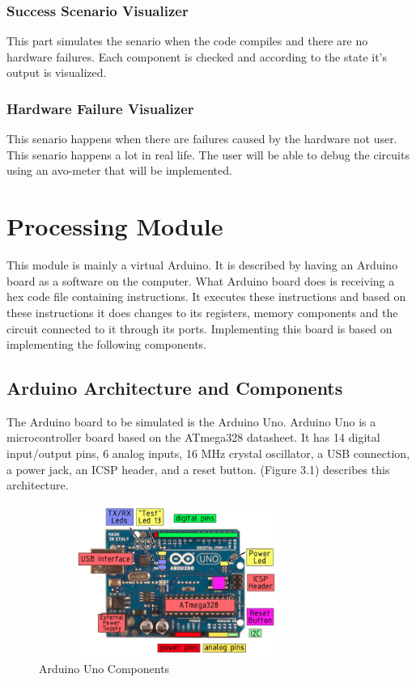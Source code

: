 \documentclass[12pt, a4paper]{report}
\begin{document}
\subsection{Success Scenario Visualizer}
This part simulates the senario when the code compiles and there are no hardware failures. Each component is checked and according to the state it’s output is visualized.
\subsection{Hardware Failure Visualizer}
This senario happens when there are failures caused by the hardware not user. This senario happens a lot in real life. The user will be able to debug the circuits using an avo-meter that will be implemented.
\newpage

\chapter{Processing Module}
This module is mainly a virtual Arduino. It is described by having an Arduino board as a software on the computer. What Arduino board does is receiving a hex code file containing instructions. It executes these instructions and based on these instructions it does changes to its registers, memory components and the circuit connected to it through its ports. Implementing this board is based on implementing the following components.

\section{Arduino Architecture and Components}
The Arduino board to be simulated is the Arduino Uno. Arduino Uno is a microcontroller board based on the ATmega328 datasheet. It has 14 digital input/output pins, 6 analog inputs, 16 MHz crystal oscillator, a USB connection, a power jack, an ICSP header, and a reset button. (Figure 3.1) describes this architecture.

\begin{figure}[h!]
\centering
\includegraphics[height=5cm, width=9cm]{UnoBoard.png}
\caption{Arduino Uno Components\protect\cite{ArduinoComponents}}
\label{Arduino Uno}
\end{figure}
\end{document}
